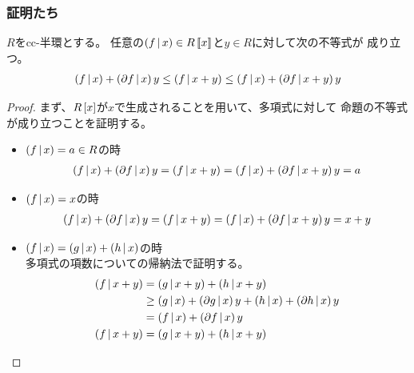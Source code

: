 {\subsubsection{証明たち}\label{s3:証明たち} %
	\begin{proposition}[Taylorの定理]\label{prop:Taylorの定理} %
		$R$をcc-半環とする。
		任意の$\mathinner{({f{\,|\,}x})}\in R\mathinner{[\![{x}]\!]}$と$y\in R$に対して次の不等式が
		成り立つ。
		\begin{equation*}\begin{split}
			\mathinner{({f{\,|\,}x})} + \mathinner{({\partial f{\,|\,}x})}y \le \mathinner{({f{\,|\,}x + y})}
			\le \mathinner{({f{\,|\,}x})} + \mathinner{({\partial f{\,|\,}x + y})}y
		\end{split}\end{equation*}
	\end{proposition} %
	\begin{proof} %
		まず、$R\mathinner{[{x}]}$が$x$で生成されることを用いて、多項式に対して
		命題の不等式が成り立つことを証明する。
		\begin{itemize}\setlength{\itemsep}{-1mm} %
			\item $\mathinner{({f{\,|\,}x})}=a\in R$の時
			\begin{equation*}\begin{split}
				\mathinner{({f{\,|\,}x})} + \mathinner{({\partial f{\,|\,}x})}y = \mathinner{({f{\,|\,}x + y})}
				= \mathinner{({f{\,|\,}x})} + \mathinner{({\partial f{\,|\,}x + y})}y = a
			\end{split}\end{equation*}
			\item $\mathinner{({f{\,|\,}x})}=x$の時
			\begin{equation*}\begin{split}
				\mathinner{({f{\,|\,}x})} + \mathinner{({\partial f{\,|\,}x})}y = \mathinner{({f{\,|\,}x + y})}
				= \mathinner{({f{\,|\,}x})} + \mathinner{({\partial f{\,|\,}x + y})}y = x + y
			\end{split}\end{equation*}
			\item $\mathinner{({f{\,|\,}x})}=\mathinner{({g{\,|\,}x})} + \mathinner{({h{\,|\,}x})}$の時 \\
			多項式の項数についての帰納法で証明する。
			\begin{equation*}\begin{split}
				\plr{f\bou x + y} &= \plr{g\bou x + y} + \plr{h\bou x + y} \\
				&\ge \plr{g\bou x} + \plr{\partial g\bou x}y
					+ \plr{h\bou x} + \plr{\partial h\bou x}y \\
				&= \plr{f\bou x} + \plr{\partial f\bou x}y \\
				\plr{f\bou x + y} &= \plr{g\bou x + y} + \plr{h\bou x + y} \\

\end{split}
\end{equation*}
\end{itemize}
\end{proof}}
